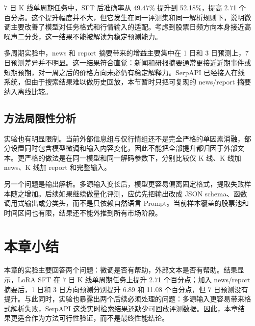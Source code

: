 7 日 K 线单周期任务中，SFT 后准确率从 49.47\% 提升到 52.18\%，提高 2.71 个百分点。这个提升幅度并不大，但它发生在同一评测集和同一解析规则下，说明微调主要改善了模型对任务格式和行情输入的适配。考虑到股票日频方向本身接近高噪声二分类，这一结果不能被解读为稳定预测能力。

多周期实验中，news 和 report 摘要带来的增益主要集中在 1 日和 3 日预测上，7 日预测差异并不明显。这一结果符合直觉：新闻和研报摘要通常更接近近期事件或短期预期，对一周之后的价格方向未必仍有稳定解释力。SerpAPI 已经接入在线系统，但由于搜索结果难以做历史回放，本节暂时只把可复现的 news/report 摘要纳入离线比较。

\subsection{方法局限性分析}

实验也有明显限制。当前外部信息组与仅行情组还不是完全严格的单因素消融，部分设置同时包含模型微调和输入内容变化，因此不能把全部提升都归因于外部文本。更严格的做法是在同一模型和同一解码参数下，分别比较仅 K 线、K 线加 news、K 线加 report 和完整输入。

另一个问题是输出解析。多源输入变长后，模型更容易偏离固定格式，提取失败样本随之增加。后续如果继续做量化评测，应优先把输出改成 JSON schema、函数调用式输出或分类头，而不是只依赖自然语言 Prompt。当前样本覆盖的股票池和时间区间也有限，结果还不能外推到所有市场阶段。

\section{本章小结}

本章的实验主要回答两个问题：微调是否有帮助，外部文本是否有帮助。结果显示，LoRA SFT 在 7 日 K 线单周期任务上提升 2.71 个百分点；加入 news/report 摘要后，1 日和 3 日方向预测分别提升 6.89 和 11.08 个百分点，但 7 日预测没有提升。与此同时，实验也暴露出两个后续必须处理的问题：多源输入更容易带来格式解析失败，SerpAPI 这类实时检索结果还缺少可回放评测数据。因此，本章结果更适合作为方法可行性验证，而不是最终性能结论。
